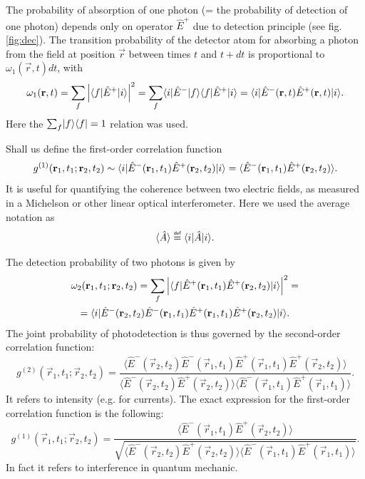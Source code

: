 The probability of  absorption of one photon (= the probability of detection of one photon) depends only on operator $\hat{E}^+$ due to detection principle (see fig. \ref{fig:dec}). The transition probability of the detector atom for absorbing a photon from the field at position $\vec{r}$ between times $t$ and $t+dt$ is proportional to $\omega_1(\vec{r},t) dt$, with
\begin{equation}
	\omega_1 (\mathbf{r}, t) = \sum_{f} \left| \langle f\rvert \hat{E}^{+} \lvert i\rangle \right|^2 = \sum_{f} \langle i\rvert \hat{E}^{-} \lvert f\rangle \langle f\rvert \hat{E}^{+} \lvert i\rangle = \langle i\rvert \hat{E}^-(\mathbf{r},t) \hat{E}^+ (\mathbf{r},t) \lvert i\rangle.
\end{equation}
Here the $\sum_{f} \lvert f\rangle \langle f\rvert = 1$ relation was used.

Shall us define the first-order correlation function
\begin{equation}
	g^{(1)} (\mathbf{r}_1,t_1; \mathbf{r}_2, t_2) \sim \langle i\rvert \hat{E}^-(\mathbf{r}_1, t_1) \hat{E}^+ (\mathbf{r}_2, t_2) \lvert i\rangle = \langle \hat{E}^-(\mathbf{r}_1, t_1) \hat{E}^+ (\mathbf{r}_2, t_2) \rangle.
\end{equation}
It is useful for quantifying the coherence between two electric fields, as measured in a Michelson or other linear optical interferometer. Here we used the average notation as 
\begin{equation}
	\langle \hat{A} \rangle \myeq \bra{i} \hat{A} \ket{i}.
\end{equation}

The detection probability of two photons is given by
\begin{multline}
	\omega_2 (\mathbf{r}_1, t_1; \mathbf{r}_2, t_2) = \sum_{f} \left| \langle f\rvert \hat{E}^+ (\mathbf{r}_1 ,t_1) \hat{E}^+ (\mathbf{r}_2 , t_2) \lvert i\rangle \right|^2 = \\ = \langle i\rvert \hat{E}^- (\mathbf{r}_2 , t_2) \hat{E}^- (\mathbf{r}_1 , t_1) \hat{E}^+ (\mathbf{r}_1 , t_1) \hat{E}^+ (\mathbf{r}_2 , t_2) \lvert i\rangle.
\end{multline}
The joint probability of photodetection is thus governed by the second-order correlation function:
\begin{equation}
	g^{(2)}(\vec{r}_1, t_1; \vec{r}_2, t_2) = \frac{\langle \hat{E}^-(\vec{r}_2, t_2) \hat{E}^-(\vec{r}_1, t_1) \hat{E}^+(\vec{r}_1, t_1) \hat{E}^+(\vec{r}_2, t_2)\rangle}{\langle \hat{E}^-(\vec{r}_2, t_2) \hat{E}^+(\vec{r}_2, t_2) \rangle \langle \hat{E}^-(\vec{r}_1, t_1) \hat{E}^+(\vec{r}_1, t_1) \rangle}.
\end{equation}
It refers to intensity (e.g. for currents). The exact expression for the first-order correlation function is the following:
\begin{equation}
	g^{(1)} (\vec{r}_1, t_1; \vec{r}_2, t_2) = \frac{\langle \hat{E}^-(\vec{r}_1, t_1) \hat{E}^+ (\vec{r}_2, t_2) \rangle}{\sqrt{\langle \hat{E}^-(\vec{r}_2, t_2) \hat{E}^+(\vec{r}_2, t_2) \rangle \langle \hat{E}^-(\vec{r}_1, t_1) \hat{E}^+(\vec{r}_1, t_1) \rangle}}.
\end{equation}
In fact it refers to interference in quantum mechanic.

